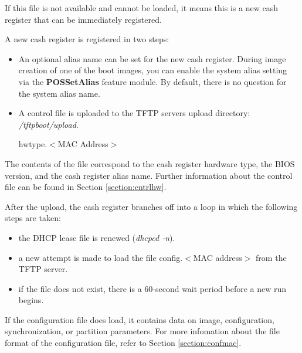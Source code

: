 \begin{enumerate}
            If this file is not available and cannot be loaded,
                        it means this is a new cash register
            that can be immediately registered.

                        A new cash register is registered
            in two steps:
                        \begin{itemize}
                        \item An optional alias name can be set for the new cash register.
                  During image creation of one of the boot images, you can
                  enable the system alias setting via the \textbf{POSSetAlias}
                  feature module. By default, there is no question for the
                  system alias name.
                        \item A control file is uploaded to the TFTP servers upload
                  directory: \textit{/tftpboot/upload}.

            \begin{Command}{8cm}
            hwtype.$<$MAC Address$>$
            \end{Command}
                        \end{itemize}

                        The contents of the file correspond to the cash register hardware
            type, the BIOS version, and the cash register alias name. Further
            information about the control file can be found in Section
            \ref{section:cntrlhw}.

            After the upload, the cash register branches off into a loop in
            which the following steps are taken:

            \begin{itemize}
            \item the DHCP lease file is renewed (\textit{dhcpcd -n}).
            \item a new attempt is made to load the file
                  config.$<$MAC address$>$ from the TFTP server.
            \item if the file does not exist, there is a 60-second wait
                  period before a new run begins.
            \end{itemize}

            If the configuration file does load, it contains data on
            image, configuration, synchronization, or partition parameters.
                        For more infomation about the file format of the configuration file,
                        refer to Section \ref{section:confmac}.


\end{enumerate}
